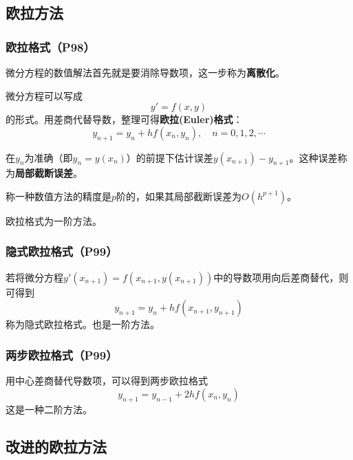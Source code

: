 \documentclass[fontset=ubuntu]{ctexart}
\numberwithin{equation}{section}
\numberwithin{theorem}{section}
\begin{document}
\begin{multicols}{2}
    \subsection{欧拉方法}

    \subsubsection{欧拉格式（P98）}

    微分方程的数值解法首先就是要消除导数项，这一步称为\textbf{离散化}。

    微分方程可以写成
    \begin{equation}
        y'=f(x,y)
    \end{equation}
    的形式。用差商代替导数，整理可得\textbf{欧拉(Euler)格式}：
    \begin{equation}
        \label{xianshi_euler}
        y_{n+1}=y_n+hf(x_n,y_n),\quad n=0,1,2,\cdots
    \end{equation}

    在$y_n$为准确（即$y_n=y(x_n)$）的前提下估计误差$y(x_{n+1})-y_{n+1}$。这种误差称为\textbf{局部截断误差}。

    称一种数值方法的精度是$p$阶的，如果其局部截断误差为$O(h^{p+1})$。

    欧拉格式为一阶方法。

    \subsubsection{隐式欧拉格式（P99）}

    若将微分方程$y'(x_{n+1})=f(x_{n+1},y(x_{n+1}))$中的导数项用向后差商替代，则可得到
    \begin{equation}
        \label{yinshi_euler}
        y_{n+1}=y_n+hf(x_{n+1},y_{n+1})
    \end{equation}
    称为隐式欧拉格式。也是一阶方法。

    \subsubsection{两步欧拉格式（P99）}

    用中心差商替代导数项，可以得到两步欧拉格式
    \begin{equation}
        y_{n+1}=y_{n-1}+2hf(x_n,y_n)
    \end{equation}
    这是一种二阶方法。

    \subsection{改进的欧拉方法}


\end{multicols}
\end{document}
